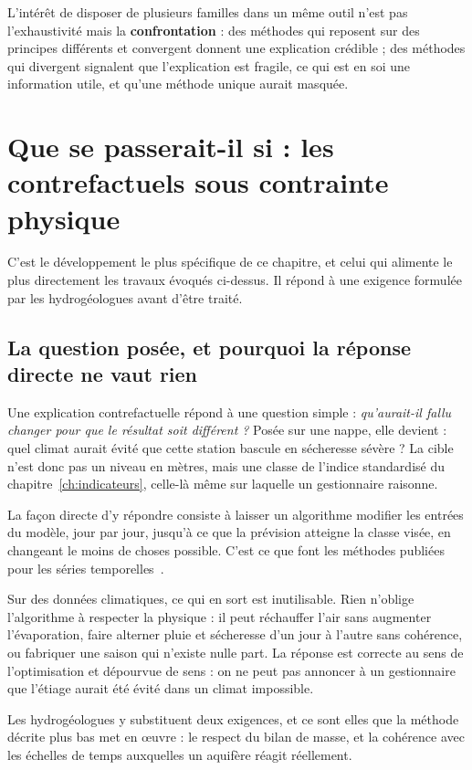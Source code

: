 L'intérêt de disposer de plusieurs familles dans un même outil n'est pas l'exhaustivité mais la
\textbf{confrontation} : des méthodes qui reposent sur des principes différents et convergent
donnent une explication crédible ; des méthodes qui divergent signalent que l'explication est
fragile, ce qui est en soi une information utile, et qu'une méthode unique aurait masquée.

\section{Que se passerait-il si : les contrefactuels sous contrainte physique}
\label{sec:physcf}

C'est le développement le plus spécifique de ce chapitre, et celui qui alimente le plus
directement les travaux évoqués ci-dessus. Il répond à une exigence formulée par les
hydrogéologues avant d'être traité.

\subsection{La question posée, et pourquoi la réponse directe ne vaut rien}

Une explication contrefactuelle répond à une question simple : \emph{qu'aurait-il fallu changer
pour que le résultat soit différent ?} Posée sur une nappe, elle devient : quel climat aurait
évité que cette station bascule en sécheresse sévère ? La cible n'est donc pas un niveau en
mètres, mais une classe de l'indice standardisé du chapitre~\ref{ch:indicateurs}, celle-là même
sur laquelle un gestionnaire raisonne.

La façon directe d'y répondre consiste à laisser un algorithme modifier les entrées du modèle,
jour par jour, jusqu'à ce que la prévision atteigne la classe visée, en changeant le moins de
choses possible. C'est ce que font les méthodes publiées pour les séries
temporelles~\cite{wachter2018counterfactual,wang2023forecastcf}.

Sur des données climatiques, ce qui en sort est inutilisable. Rien n'oblige l'algorithme à
respecter la physique : il peut réchauffer l'air sans augmenter l'évaporation, faire alterner
pluie et sécheresse d'un jour à l'autre sans cohérence, ou fabriquer une saison qui n'existe
nulle part. La réponse est correcte au sens de l'optimisation et dépourvue de sens : on ne peut
pas annoncer à un gestionnaire que l'étiage aurait été évité dans un climat impossible.

Les hydrogéologues y substituent deux exigences, et ce sont elles que la méthode décrite plus
bas met en œuvre : le respect du bilan de masse, et la cohérence avec les échelles de temps
auxquelles un aquifère réagit réellement.

